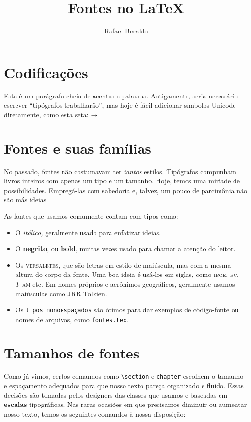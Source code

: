 \documentclass[11pt,a4paper,oneside]{article}
\title{Fontes no \LaTeX}
\author{Rafael Beraldo}
\begin{document}
\frenchspacing

\maketitle

\section{Codificações}

Este é um parágrafo cheio de acentos e palavras. Antigamente, seria necessário
escrever “tip\'{o}grafos trabalhar\~{a}o”, mas hoje é fácil adicionar símbolos
Unicode diretamente, como esta seta: →

\section{Fontes e suas famílias}

No passado, fontes não costumavam ter \emph{tantos} estilos. Tipógrafos
compunham livros inteiros com apenas um tipo e um tamanho. Hoje, temos uma
miríade de possibilidades. Empregá-las com sabedoria e, talvez, um pouco de
parcimônia não são más ideias.

As fontes que usamos comumente contam com tipos como:

\begin{itemize}
  \item O \emph{itálico,} geralmente usado para enfatizar ideias.
  \item O \textbf{negrito}, ou \textbf{bold}, muitas vezes usado para chamar a
    atenção do leitor.
  \item Os \textsc{versaletes}, que são letras em estilo de maiúscula, mas com
    a mesma altura do corpo da fonte. Uma boa ideia é usá-los em siglas, como
    \textsc{ibge}, \textsc{bc}, 3~\textsc{am} etc. Em nomes próprios e
    acrônimos geográficos, geralmente usamos maiúsculas como JRR Tolkien.
  \item Os \texttt{tipos monoespaçados} são ótimos para dar exemplos de
    código-fonte ou nomes de arquivos, como \texttt{fontes.tex}.
\end{itemize}

\section{Tamanhos de fontes}

Como já vimos, certos comandos como \verb+\section+ e \verb+chapter+ escolhem o
tamanho e espaçamento adequados para que nosso texto pareça organizado e
fluido. Essas decisões são tomadas pelos designers das classes que usamos e
baseadas em \textbf{escalas} tipográficas. Nas raras ocasiões em que precisamos
\footnotesize diminuir \Large ou aumentar \normalsize nosso texto, temos os seguintes
comandos à nossa disposição:
\end{document}
